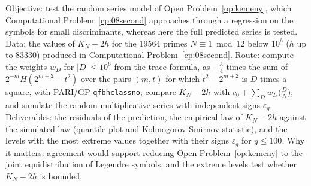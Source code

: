 \begin{compproblem}\label{cp:13kemeny}
Objective: test the random series model of Open Problem~\ref{op:kemeny}, which Computational Problem~\ref{cp:08second} approaches through a regression on the symbols for small discriminants, whereas here the full predicted series is tested. Data: the values of $K_N-2h$ for the $19564$ primes $N\equiv1\bmod12$ below $10^6$ ($h$ up to $83330$) produced in Computational Problem~\ref{cp:08second}. Route: compute the weights $w_D$ for $|D|\le10^6$ from the trace formula, as $-\tfrac34$ times the sum of $2^{-m}H(2^{m+2}-t^2)$ over the pairs $(m,t)$ for which $t^2-2^{m+2}$ is $D$ times a square, with PARI/GP \texttt{qfbhclassno}; compare $K_N-2h$ with $c_0+\sum_Dw_D\bigl(\tfrac DN\bigr)$; and simulate the random multiplicative series with independent signs $\varepsilon_q$. Deliverables: the residuals of the prediction, the empirical law of $K_N-2h$ against the simulated law (quantile plot and Kolmogorov Smirnov statistic), and the levels with the most extreme values together with their signs $\varepsilon_q$ for $q\le100$. Why it matters: agreement would support reducing Open Problem~\ref{op:kemeny} to the joint equidistribution of Legendre symbols, and the extreme levels test whether $K_N-2h$ is bounded.
\end{compproblem}
